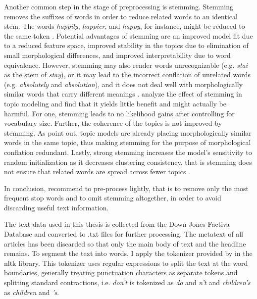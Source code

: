 \documentclass[11pt,a4paper,english,oneside]{book}
\numberwithin{equation}{chapter}
\begin{document}
Another common step in the stage of preprocessing is stemming. Stemming removes the suffixes of words in order to reduce related words to an identical stem. The words \textit{happily}, \textit{happier}, and \textit{happy}, for instance, might be reduced to the same token \cite[p. 287]{Schofield.2016}. Potential advantages of stemming are an improved model fit due to a reduced feature space, improved stability in the topics due to elimination of small morphological differences, and improved interpretability due to word equivalence.  However, stemming may also render words unrecognizable (e.g. \textit{stai} as the stem of \textit{stay}), or it may lead to the incorrect conflation of unrelated words (e.g. \textit{absolutely} and \textit{absolution}), and it does not deal well with morphologically similar words that carry different meanings \cite[p. 287]{Schofield.2016}. \cite{Schofield.2016} analyze the effect of stemming in topic modeling and find that it yields little benefit and might actually be harmful. For one, stemming leads to no likelihood gains after controlling for vocabulary size. Further, the coherence of the topics is not improved by stemming. As \citet{Schofield.2017} point out, topic models are already placing morphologically similar words in the same topic, thus making stemming for the purpose of morphological conflation redundant. Lastly, strong stemming increases the model's sensitivity to random initialization as it decreases clustering consistency, that is stemming does not ensure that related words are spread across fewer topics \cite[p. 293--295]{Schofield.2016}.  

In conclusion, \cite{Schofield.2017} recommend to pre-process lightly, that is to remove only the most frequent stop words and to omit stemming altogether, in order to avoid discarding useful text information. 

The text data used in this thesis is collected from the Down Jones Factiva Database and converted to .txt files for further processing. The metatext of all articles has been discarded so that only the main body of text and the headline remains. To segment the text into words, I apply the tokenizer provided by \cite{Bird.2010} in the nltk library. This tokenizer uses regular expressions to split the text at the word boundaries, generally treating punctuation characters as separate tokens and splitting standard contractions, i.e. \textit{don't} is tokenized as \textit{do} and \textit{n't} and \textit{children's} as \textit{children} and \textit{'s}. 
\end{document}

